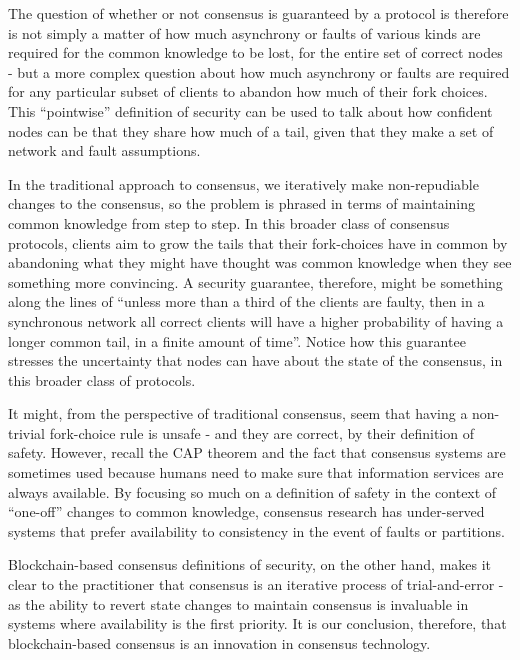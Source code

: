 \documentclass[11pt,a4paper]{article}
\theoremstyle{plain}
\theoremstyle{definition}
\begin{document}
The question of whether or not consensus is guaranteed by a protocol is therefore is not simply a matter of how much asynchrony or faults of various kinds are required for the common knowledge to be lost, for the entire set of correct nodes - but a more complex question about how much asynchrony or faults are required for any particular subset of clients to abandon how much of their fork choices. This ``pointwise'' definition of security can be used to talk about how confident nodes can be that they share how much of a tail, given that they make a set of network and fault assumptions. 


In the traditional approach to consensus, we iteratively make non-repudiable changes to the consensus, so the problem is phrased in terms of maintaining common knowledge from step to step. In this broader class of consensus protocols, clients aim to grow the tails that their fork-choices have in common by abandoning what they might have thought was common knowledge when they see something more convincing. A security guarantee, therefore, might be something along the lines of ``unless more than a third of the clients are faulty, then in a synchronous network all correct clients will have a higher probability of having a longer common tail, in a finite amount of time''. Notice how this guarantee stresses the uncertainty that nodes can have about the state of the consensus, in this broader class of protocols.

It might, from the perspective of traditional consensus, seem that having a non-trivial fork-choice rule is unsafe - and they are correct, by their definition of safety. However, recall the CAP theorem and the fact that consensus systems are sometimes used because humans need to make sure that information services are always available. By focusing so much on a definition of safety in the context of ``one-off'' changes to common knowledge, consensus research has under-served systems that prefer availability to consistency in the event of faults or partitions. 

Blockchain-based consensus definitions of security, on the other hand, makes it clear to the practitioner that consensus is an iterative process of trial-and-error - as the ability to revert state changes to maintain consensus is invaluable in systems where availability is the first priority. It is our conclusion, therefore, that blockchain-based consensus is an innovation in consensus technology.
\end{document}
